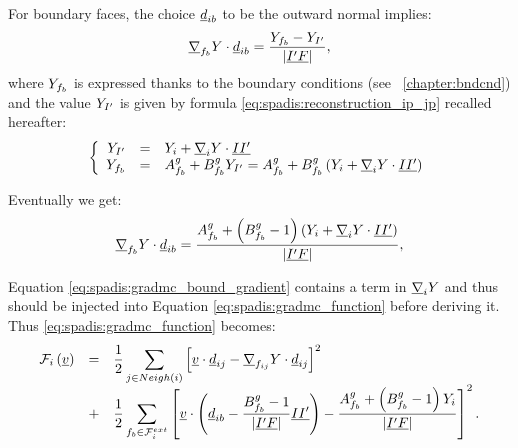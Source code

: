 For boundary faces, the choice $\underline{d}_{ib}$ to be the outward normal implies:
\begin{equation}
\underline{\nabla}_{{f_{b}}} Y   \cdot \underline{d}_{ib} =\dfrac{Y_{f_{b}} - Y_{I^\prime} }{\left| \underline{{I^\prime} F} \right|},
\end{equation}
where $Y_{f_{b}}$ is expressed thanks to the boundary conditions (see \chaptername~\ref{chapter:bndcnd}) and
the value $Y_{I^\prime} $ is given by formula \eqref{eq:spadis:reconstruction_ip_jp} recalled hereafter:
%
\begin{equation}\label{eq:spadis:gradmc_bound_value}
\left\{\begin{array}{r c l}
Y_{I^\prime} &=&Y_i +\underline{\nabla}_i Y \cdot \underline{I {I^\prime}}\\
Y_{f_{b}} &=& A^g_{f_{b}} +B^g_{f_{b}} Y_{I^\prime} = A^g_{f_{b}} +B^g_{f_{b}} \left( Y_i +  \underline{\nabla}_i Y \cdot \underline{I {I^\prime}} \right)
\end{array}\right.
\end{equation}

Eventually we get:
\begin{equation}\label{eq:spadis:gradmc_bound_gradient}
\underline{\nabla}_{{f_{b}}} Y   \cdot \underline{d}_{ib} =
\dfrac{
A^g_{f_{b}} +\left(B^g_{f_{b}} -1 \right) \left( Y_i +  \underline{\nabla}_i Y \cdot \underline{I {I^\prime}} \right)
}{
\left| \underline{{I^\prime} F} \right|
},
\end{equation}

Equation \eqref{eq:spadis:gradmc_bound_gradient} contains a term in $\underline{\nabla}_i Y$
and thus should be injected into Equation
\eqref{eq:spadis:gradmc_function} before deriving it. Thus \eqref{eq:spadis:gradmc_function} becomes:
\begin{equation}\label{eq:spadis:gradmc_function2}
\begin{array}{r c l}
\mathcal{F}_i
\left( \underline{v} \right)& =&
\displaystyle
\dfrac{1}{2}\sum\limits_{ j \in Neigh\left(i\right) }\left[
\underline{v}   \cdot \underline{d}_{ij}  -  \underline{\nabla}_{{f_{ij}}} Y   \cdot \underline{d}_{ij}
\right]^2 \\
&+&
\displaystyle
\dfrac{1}{2}\sum\limits_{ {f_{b}} \in \mathcal{F}^{ext}_{i}}\left[
  \underline{v}   \cdot
  \left( \underline{d}_{ib} -  \dfrac{B^g_{f_{b}} -1 }{\left| \underline{{I^\prime} F} \right|} \underline{I {I^\prime}} \right)
-
\dfrac{
A^g_{f_{b}} +\left(B^g_{f_{b}} -1 \right) Y_i
}{
\left| \underline{{I^\prime} F} \right|
}
\right]^2.
\end{array}
\end{equation}


